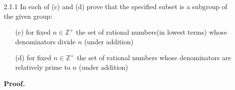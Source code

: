 \documentclass[9pt]{article}
\newcommand{\Z}{\mathbb{Z}}
\begin{document}
\begin{enumerate}
   \item[2.1.1]   In each of (c) and (d) prove that the specified subset is a
                  subgroup of the given group:
                  \begin{enumerate}
                     \item[(c)]  for fixed $n \in \Z^+$ the set of rational 
                                 numbers(in lowest terms) whose denominators 
                                 divide $n$ (under addition)
                     \item[(d)]  for fixed $n \in \Z^+$ the set of rational 
                                 numbers whose denominators are relatively prime 
                                 to $n$ (under addition)
                  \end{enumerate}
                  
      \textbf{Proof.}
      

\end{enumerate}
\end{document}
